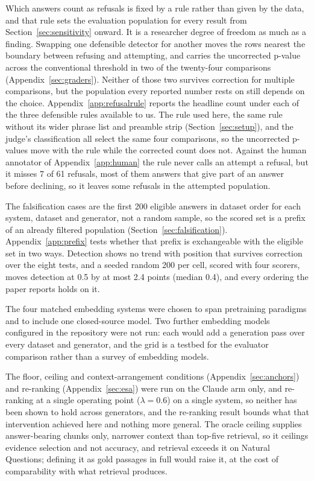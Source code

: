 \documentclass[11pt]{article}
\newcommand{\movedref}{Appendix}            %
\newcommand{\movedref}{Section}
\begin{document}
Which answers count as refusals is fixed by a rule rather than given by the data, and that rule sets the evaluation population for every result from Section~\ref{sec:sensitivity} onward. It is a researcher degree of freedom as much as a finding. Swapping one defensible detector for another moves the rows nearest the boundary between refusing and attempting, and carries the uncorrected p-value across the conventional threshold in two of the twenty-four comparisons (\movedref~\ref{sec:graders}). Neither of those two survives correction for multiple comparisons, but the population every reported number rests on still depends on the choice. Appendix~\ref{app:refusalrule} reports the headline count under each of the three defensible rules available to us. The rule used here, the same rule without its wider phrase list and preamble strip (Section~\ref{sec:setup}), and the judge's classification all select the same four comparisons, so the uncorrected p-values move with the rule while the corrected count does not. Against the human annotator of Appendix~\ref{app:human} the rule never calls an attempt a refusal, but it misses 7 of 61 refusals, most of them answers that give part of an answer before declining, so it leaves some refusals in the attempted population.

The falsification cases are the first 200 eligible answers in dataset order for each system, dataset and generator, not a random sample, so the scored set is a prefix of an already filtered population (Section~\ref{sec:falsification}). Appendix~\ref{app:prefix} tests whether that prefix is exchangeable with the eligible set in two ways. Detection shows no trend with position that survives correction over the eight tests, and a seeded random 200 per cell, scored with four scorers, moves detection at 0.5 by at most 2.4 points (median 0.4), and every ordering the paper reports holds on it.

The four matched embedding systems were chosen to span pretraining paradigms and to include one closed-source model. Two further embedding models configured in the repository were not run: each would add a generation pass over every dataset and generator, and the grid is a testbed for the evaluator comparison rather than a survey of embedding models.

The floor, ceiling and context-arrangement conditions (Appendix~\ref{sec:anchors}) and re-ranking (Appendix~\ref{sec:esa}) were run on the Claude arm only, and re-ranking at a single operating point ($\lambda = 0.6$) on a single system, so neither has been shown to hold across generators, and the re-ranking result bounds what that intervention achieved here and nothing more general. The oracle ceiling supplies answer-bearing chunks only, narrower context than top-five retrieval, so it ceilings evidence selection and not accuracy, and retrieval exceeds it on Natural Questions; defining it as gold passages in full would raise it, at the cost of comparability with what retrieval produces.
\end{document}
